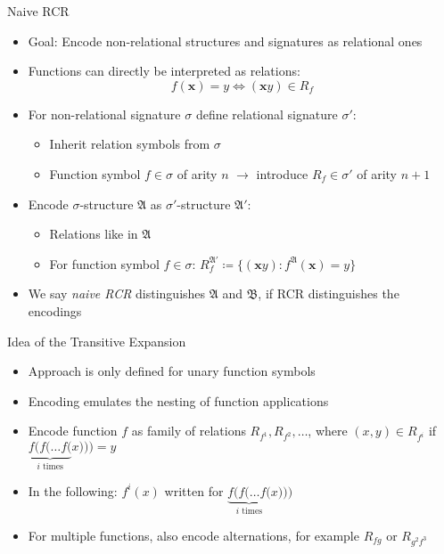 \documentclass[aspectratio=169]{beamer}
\newcommand{\term}[1]{\operatorname{\mathit{#1}}}
\begin{document}
	\begin{frame}{Naive RCR}
		\begin{itemize}
			\item Goal: Encode non-relational structures and signatures as relational ones
			\item Functions can directly be interpreted as relations:
			$$f(\mathbf x)=y \Longleftrightarrow (\mathbf xy)\in R_f$$
			\item For non-relational signature $\sigma$ define relational signature $\sigma'$:
			\begin{itemize}
				\item Inherit relation symbols from $\sigma$
				\item Function symbol $f\in\sigma$ of arity $n$ $\rightarrow$ introduce $R_f\in\sigma'$ of arity $n+1$
			\end{itemize}
			\item Encode $\sigma$-structure $\mathfrak A$ as $\sigma'$-structure $\mathfrak A'$:
			\begin{itemize}
				\item Relations like in $\mathfrak A$
				\item For function symbol $f\in \sigma$: $R_f^{\mathfrak A'}\coloneqq \{(\mathbf xy) : f^{\mathfrak A}(\mathbf x)=y\}$
			\end{itemize}
			\item We say \emph{naive RCR} distinguishes $\mathfrak A$ and $\mathfrak B$, if RCR distinguishes the encodings
		\end{itemize}
	\end{frame}
	
	\begin{frame}{Idea of the Transitive Expansion}
		\begin{itemize}
			\item Approach is only defined for unary function symbols
			\item Encoding emulates the nesting of function applications
			\item Encode function $f$ as family of relations $R_{f^1},R_{f^2},\dots$, where $(x,y)\in R_{f^i}$ if $\underbrace{f(f(\dots f(}_{i\text{ times}}x)))=y$
			\item In the following: $f^i(x)$ written for $\underbrace{f(f(\dots f(}_{i\text{ times}}x)))$
			\item For multiple functions, also encode alternations, for example $R_{\term {fg}}$ or $R_{g^2f^3}$
		\end{itemize}
	\end{frame}
	
\end{document}
